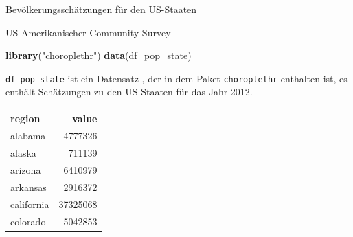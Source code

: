 \documentclass[ignorenonframetext,]{beamer}
\newenvironment{Shaded}{\begin{snugshade}}{\end{snugshade}}
\newcommand{\KeywordTok}[1]{\textcolor[rgb]{0.13,0.29,0.53}{\textbf{#1}}}
\newcommand{\NormalTok}[1]{#1}
\newcommand{\StringTok}[1]{\textcolor[rgb]{0.31,0.60,0.02}{#1}}
\begin{document}
\begin{frame}[fragile]{Bevölkerungsschätzungen für den US-Staaten}
\protect\hypertarget{bevolkerungsschatzungen-fur-den-us-staaten}{}

\begin{block}{US Amerikanischer Community Survey}

\begin{Shaded}
\begin{Highlighting}[]
\KeywordTok{library}\NormalTok{(}\StringTok{"choroplethr"}\NormalTok{)}
\KeywordTok{data}\NormalTok{(df_pop_state)}
\end{Highlighting}
\end{Shaded}

\texttt{df\_pop\_state} ist ein Datensatz , der in dem Paket
\texttt{choroplethr} enthalten ist, es enthält Schätzungen zu den
US-Staaten für das Jahr 2012.

\begin{longtable}[]{@{}lr@{}}
\toprule
region & value\tabularnewline
\midrule
\endhead
alabama & 4777326\tabularnewline
alaska & 711139\tabularnewline
arizona & 6410979\tabularnewline
arkansas & 2916372\tabularnewline
california & 37325068\tabularnewline
colorado & 5042853\tabularnewline
\bottomrule
\end{longtable}

\end{block}

\end{frame}
\end{document}
